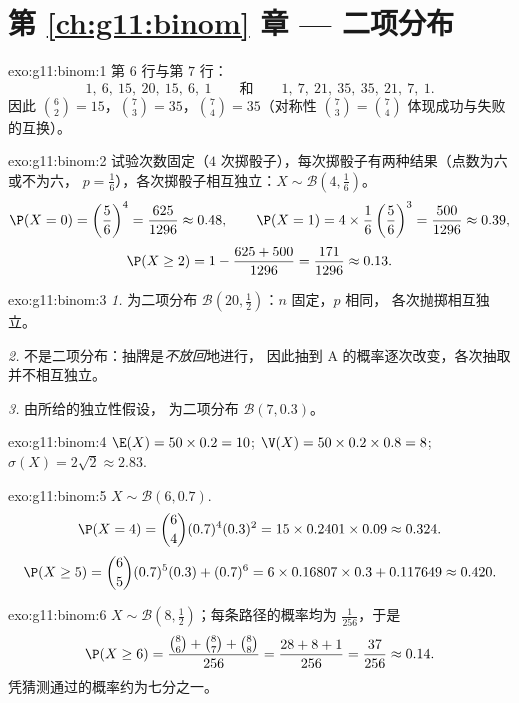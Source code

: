 \section*{第 \ref{ch:g11:binom} 章 --- 二项分布}

\begin{solution}{exo:g11:binom:1}
第 $6$ 行与第 $7$ 行：
\[
1,\ 6,\ 15,\ 20,\ 15,\ 6,\ 1
\qquad\text{和}\qquad
1,\ 7,\ 21,\ 35,\ 35,\ 21,\ 7,\ 1 .
\]
因此 $\binom62 = 15$，$\binom73 = 35$，$\binom74 = 35$（对称性
$\binom73 = \binom74$ 体现成功与失败的互换）。
\end{solution}

\begin{solution}{exo:g11:binom:2}
试验次数固定（$4$ 次掷骰子），每次掷骰子有两种结果（点数为六或不为六，
$p = \frac16$），各次掷骰子相互独立：$X \sim \mathcal B(4, \frac16)$。
\[
\P(X=0) = \left(\frac56\right)^4 = \frac{625}{1296} \approx 0.48,
\qquad
\P(X=1) = 4 \times \frac16\left(\frac56\right)^3 = \frac{500}{1296}
\approx 0.39,
\]
\[
\P(X \geq 2) = 1 - \frac{625 + 500}{1296} = \frac{171}{1296}
\approx 0.13 .
\]
\end{solution}

\begin{solution}{exo:g11:binom:3}
\emph{1.} 为二项分布 $\mathcal B(20, \frac12)$：$n$ 固定，$p$ 相同，
各次抛掷相互独立。

\emph{2.} 不是二项分布：抽牌是\emph{不放回}地进行，
因此抽到 A 的概率逐次改变，各次抽取
并不相互独立。

\emph{3.} 由所给的独立性假设，
为二项分布 $\mathcal B(7, 0.3)$。
\end{solution}

\begin{solution}{exo:g11:binom:4}
$\E(X) = 50 \times 0.2 = 10$;
$\V(X) = 50 \times 0.2 \times 0.8 = 8$;
$\sigma(X) = 2\sqrt2 \approx 2.83$.
\end{solution}

\begin{solution}{exo:g11:binom:5}
$X \sim \mathcal B(6, 0.7)$.
\[
\P(X = 4) = \binom64 (0.7)^4 (0.3)^2 = 15 \times 0.2401 \times 0.09
\approx 0.324 .
\]
\[
\P(X \geq 5) = \binom65 (0.7)^5(0.3) + (0.7)^6
= 6 \times 0.16807 \times 0.3 + 0.117649 \approx 0.420 .
\]
\end{solution}

\begin{solution}{exo:g11:binom:6}
$X \sim \mathcal B\left(8, \frac12\right)$；每条路径的概率均为
$\frac{1}{256}$，于是
\[
\P(X \geq 6) = \frac{\binom86 + \binom87 + \binom88}{256}
= \frac{28 + 8 + 1}{256} = \frac{37}{256} \approx 0.14 .
\]
凭猜测通过的概率约为七分之一。
\end{solution}

